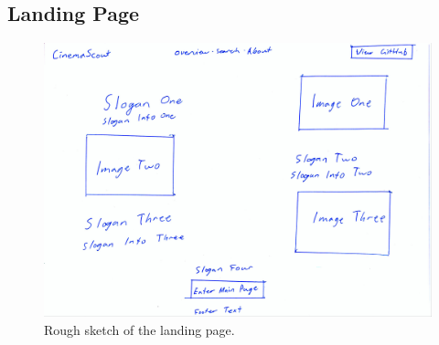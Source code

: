 \documentclass{article}
\begin{document}
\subsection{Landing Page}
\begin{figure}[H]
\includegraphics[width=\columnwidth]{res/landing.jpg}
\caption{Rough sketch of the landing page.}
\end{figure}
\end{document}
